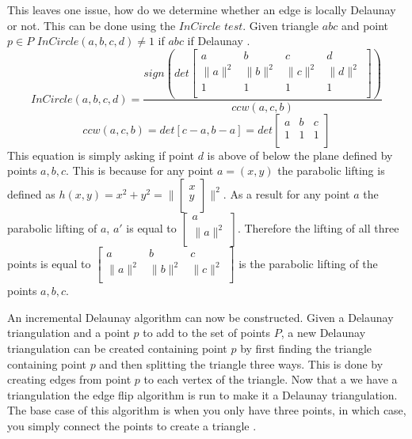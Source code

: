 \documentclass[11pt]{article}
\begin{document}
This leaves one issue, how do we determine whether an edge is locally Delaunay or not. This can be done using the $InCircle$ $test$. Given triangle $abc$ and point $p \in P$ $InCircle(a,b,c,d) \neq 1$ if $abc$ if Delaunay \cite{princeton:CCW}. 
	\begin{equation}
		InCircle(a,b,c,d) = \frac{sign(det
		\begin{bmatrix}
    			a & b & c & d \\
    			\|a\|^2 & \|b\|^2 & \|c\|^2 & \|d\|^2 \\
    			1 & 1 & 1 & 1 \\
		\end{bmatrix} 
		)}{ccw(a,c,b)}
	\end{equation}
	\begin{equation}
		ccw(a,c,b) = det[c-a,b-a] = det
		\begin{bmatrix}
    			a & b & c \\
    			1 & 1 & 1\\
		\end{bmatrix} 
	\end{equation} 
	This equation is simply asking if point $d$ is above of below the plane defined by points $a,b,c$. This is because for any point $a = (x,y)$ the parabolic lifting is defined as $h(x,y) = x^2 + y^2 = \| 
	\begin{bmatrix} 
		x \\
		y \\ 
	\end{bmatrix} 
	\|^2$.
	As a result for any point $a$ the parabolic lifting of $a$, $a'$ is equal to $
	\begin{bmatrix} 
		a \\ 
		\| a \|^2 \\ 
	\end{bmatrix}$. 
	Therefore the lifting of all three points is equal to
	$\begin{bmatrix}
    			a & b & c \\
    			\|a\|^2 & \|b\|^2 & \|c\|^2 \\
	\end{bmatrix}$ 
	is the parabolic lifting of the points $a,b,c$.

An incremental Delaunay algorithm can now be constructed. Given a Delaunay triangulation and a point $p$ to add to the set of points $P$, a new Delaunay triangulation can be created containing point $p$ by first finding the triangle containing point $p$ and then splitting the triangle three ways. This is done by creating edges from point $p$ to each vertex of the triangle. Now that a we have a triangulation the edge flip algorithm is run to make it a Delaunay triangulation. The base case of this algorithm is when you only have three points, in which case, you simply connect the points to create a triangle \cite{meshGeneration}. 
\end{document}
